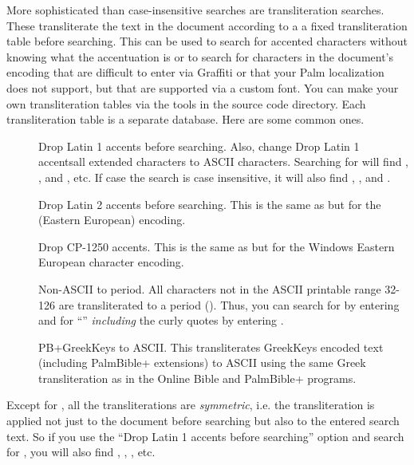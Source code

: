 More sophisticated than case-insensitive searches are transliteration
searches.  These transliterate the text in the document according to a
a fixed transliteration table before searching.  This can be used to search
for accented characters without knowing what the accentuation is or to search
for characters in the document's encoding that are difficult to enter via
Graffiti or that your Palm localization does not support, but that are
supported via a custom font.  You can make your own transliteration tables
via the tools in the source code  directory.  Each
transliteration table is a separate  database.  Here are some
common ones.\\

\begin{description}
  \item[] Drop Latin 1 accents before searching.  Also, change
        Drop Latin 1 accentsall extended characters to ASCII characters.
        Searching for  will find , ,  and
        , etc.  If case the search is case insensitive, it will also
        find , ,  and .
  \item[] Drop Latin 2 accents before searching.  This is the
        same as  but for the 
        (Eastern European) encoding.
  \item[] Drop CP-1250 accents.  This is the same as
         but for the Windows Eastern European character
        encoding.
  \item[] Non-ASCII to period.  All characters not
        in the ASCII printable range 32-126 are transliterated to a period
        ().  Thus, you can search for  by entering
         and for ``'' \emph{including} the curly quotes
        by entering .
  \item[] PB+GreekKeys to ASCII.  This transliterates
        GreekKeys encoded text (including PalmBible+ extensions) to ASCII
        using the same Greek transliteration as in the Online Bible and
        PalmBible+ programs.
\end{description}

Except for , all the transliterations are
\emph{symmetric}, i.e. the transliteration is applied not just to the document
before searching but also to the entered search text.  So if you use the
``Drop Latin 1 accents before searching'' option and search for ,
you will also find , , , etc.\\

